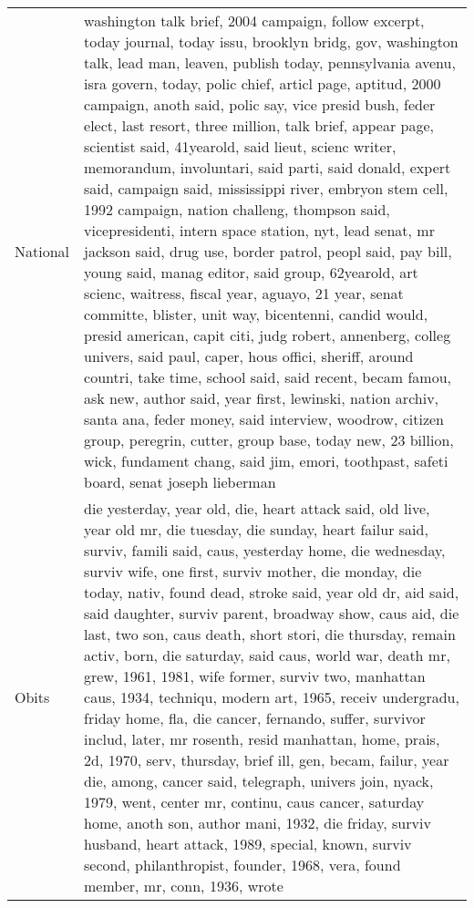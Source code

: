 \begin{longtable}{p{}p{}}
  National & washington talk brief, 2004 campaign, follow excerpt, today journal, today issu, brooklyn bridg, gov, washington talk, lead man, leaven, publish today, pennsylvania avenu, isra govern, today, polic chief, articl page, aptitud, 2000 campaign, anoth said, polic say, vice presid bush, feder elect, last resort, three million, talk brief, appear page, scientist said, 41yearold, said lieut, scienc writer, memorandum, involuntari, said parti, said donald, expert said, campaign said, mississippi river, embryon stem cell, 1992 campaign, nation challeng, thompson said, vicepresidenti, intern space station, nyt, lead senat, mr jackson said, drug use, border patrol, peopl said, pay bill, young said, manag editor, said group, 62yearold, art scienc, waitress, fiscal year, aguayo, 21 year, senat committe, blister, unit way, bicentenni, candid would, presid american, capit citi, judg robert, annenberg, colleg univers, said paul, caper, hous offici, sheriff, around countri, take time, school said, said recent, becam famou, ask new, author said, year first, lewinski, nation archiv, santa ana, feder money, said interview, woodrow, citizen group, peregrin, cutter, group base, today new, 23 billion, wick, fundament chang, said jim, emori, toothpast, safeti board, senat joseph lieberman \\ 
  Obits & die yesterday, year old, die, heart attack said, old live, year old mr, die tuesday, die sunday, heart failur said, surviv, famili said, caus, yesterday home, die wednesday, surviv wife, one first, surviv mother, die monday, die today, nativ, found dead, stroke said, year old dr, aid said, said daughter, surviv parent, broadway show, caus aid, die last, two son, caus death, short stori, die thursday, remain activ, born, die saturday, said caus, world war, death mr, grew, 1961, 1981, wife former, surviv two, manhattan caus, 1934, techniqu, modern art, 1965, receiv undergradu, friday home, fla, die cancer, fernando, suffer, survivor includ, later, mr rosenth, resid manhattan, home, prais, 2d, 1970, serv, thursday, brief ill, gen, becam, failur, year die, among, cancer said, telegraph, univers join, nyack, 1979, went, center mr, continu, caus cancer, saturday home, anoth son, author mani, 1932, die friday, surviv husband, heart attack, 1989, special, known, surviv second, philanthropist, founder, 1968, vera, found member, mr, conn, 1936, wrote \\ 

\end{longtable}
